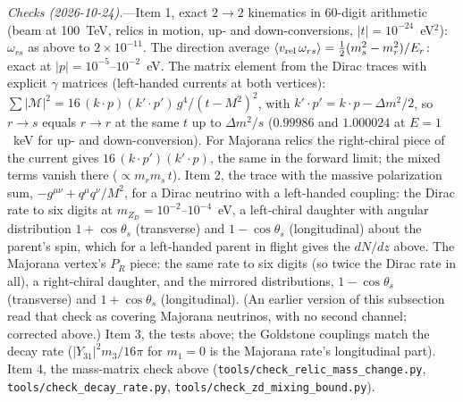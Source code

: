 \documentclass[11pt,a4paper]{article}
\newcommand{\file}[1]{\nolinkurl{#1}}
\newcommand{\mzd}{m_{Z_D}}
\begin{document}
\textit{Checks (2026-10-24).}---Item 1, exact $2\to2$ kinematics in 60-digit arithmetic (beam at 100~TeV, relics in
motion, up- and down-conversions, $|t| = 10^{-24}$~eV$^2$): $\omega_{rs}$ as above to $2\times10^{-11}$. The
direction average $\langle v_{\rm rel}\,\omega_{rs}\rangle = \frac12(m_s^2 - m_r^2)/E_r$: exact at
$|p| = 10^{-5}$--$10^{-2}$~eV. The matrix element from the Dirac traces with explicit $\gamma$ matrices (left-handed
currents at both vertices): $\sum|\mathcal{M}|^2 = 16\,(k\cdot p)(k'\cdot p')\,g^4/(t - M^2)^2$, with
$k'\cdot p' = k\cdot p - \Delta m^2/2$, so $r \to s$ equals $r \to r$ at the same $t$ up to $\Delta m^2/s$
($0.99986$ and $1.000024$ at $E = 1$~keV for up- and down-conversion). For Majorana relics the right-chiral piece of
the current gives $16\,(k\cdot p')(k'\cdot p)$, the same in the forward limit; the mixed terms vanish there
($\propto m_r m_s\,t$). Item 2, the trace with the massive polarization sum, $-g^{\mu\nu} + q^\mu q^\nu/M^2$, for a
Dirac neutrino with a left-handed coupling: the Dirac rate to six digits at $\mzd = 10^{-2}$--$10^{-4}$~eV, a
left-chiral daughter with angular distribution $1 + \cos\theta_s$ (transverse) and $1 - \cos\theta_s$ (longitudinal)
about the parent's spin, which for a left-handed parent in flight gives the $dN/dz$ above. The Majorana vertex's
$P_R$ piece: the same rate to six digits (so twice the Dirac rate in all), a right-chiral daughter, and the mirrored
distributions, $1 - \cos\theta_s$ (transverse) and $1 + \cos\theta_s$ (longitudinal). (An earlier version of this
subsection read that check as covering Majorana neutrinos, with no second channel; corrected above.) Item 3, the
tests above; the Goldstone couplings match the decay rate ($|Y_{31}|^2 m_3/16\pi$ for $m_1 = 0$ is the Majorana rate's
longitudinal part). Item 4, the mass-matrix check above (\file{tools/check\_relic\_mass\_change.py},
\file{tools/check\_decay\_rate.py}, \file{tools/check\_zd\_mixing\_bound.py}).


\newcommand{\fdscat}[4]{%
\begin{tikzpicture}[baseline=(b)]\begin{feynman}
\vertex (a) at (0,0); \vertex (b) at (0,-1.3);
\vertex (i1) at (-1.3,0.45) {\(#1\)}; \vertex (f1) at (1.3,0.45) {\(#2\)};
\vertex (i2) at (-1.3,-1.75) {\(#3\)}; \vertex (f2) at (1.3,-1.75) {\(#4\)};
\diagram*{(i1) -- [fermion] (a) -- [fermion] (f1), (i2) -- [fermion] (b) -- [fermion] (f2),
(a) -- [boson, edge label'=\(Z_D\)] (b)};
\end{feynman}\end{tikzpicture}}
\end{document}
